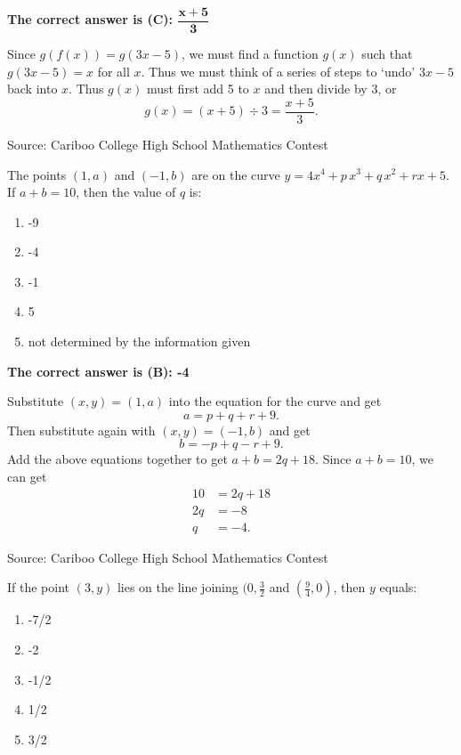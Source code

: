 \documentclass{article}
\begin{document}
\textbf{The correct answer is (C): $\mathbf{\dfrac{x+5}{3}}$}

Since $g(f(x)) = g(3x-5)$, we must find a function $g(x)$ such that $g(3x-5)=x$ for all $x$. Thus we must think of a series of steps to `undo' $3x-5$ back into $x$. Thus $g(x)$ must first add 5 to $x$ and then divide by 3, or
\[
g(x) = (x+5) \div 3 = \frac{x+5}{3}.
\] 

\vskip 1.5cm


\scriptsize
Source: Cariboo College High School Mathematics Contest

\normalsize
The points $(1,a)$ and $(-1,b)$ are on the curve $y=4x^4+p\,x^3+q\,x^2+rx+5$. If $a+b=10$, then the value of $q$ is:
\begin{enumerate}[noitemsep,topsep=0mm,leftmargin=*,widest=D,label=\Alph*)]
	\item -9
	\item -4
	\item -1
	\item 5
	\item not determined by the information given
\end{enumerate}

\textbf{The correct answer is (B): -4}

Substitute $(x,y)=(1,a)$ into the equation for the curve and get
\[
a=p+q+r+9.
\]
Then substitute again with $(x,y)=(-1,b)$ and get
\[
b= -p+q-r+9.
\]
Add the above equations together to get $a+b=2q+18$. Since $a+b=10$, we can get
\begin{align*}
10&=2q+18\\
2q&=-8\\
q&=-4.
\end{align*}

\vskip 1.5cm


\scriptsize
Source: Cariboo College High School Mathematics Contest

\normalsize
If the point $(3,y)$ lies on the line joining $(0,\frac{3}{2}$ and $(\frac{9}{4},0)$, then $y$ equals:
\begin{enumerate}[noitemsep,topsep=0mm,leftmargin=*,widest=D,label=\Alph*)]
	\item -7/2
	\item -2
	\item -1/2
	\item 1/2
	\item 3/2
\end{enumerate}
\end{document}
